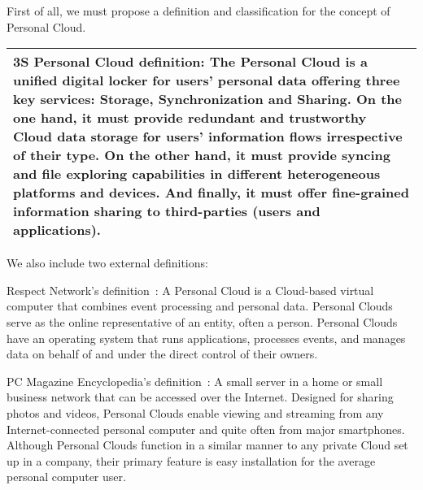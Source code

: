 First of all, we must propose a definition and classification for the concept of Personal Cloud.



{

\noindent\noindent\begin{tabularx}{\textwidth}{|m{}|}
\hline %
 \rowcolor[gray]{.8}
\textbf{3S Personal Cloud definition:} The Personal Cloud is a unified digital  locker for users' personal data offering three key services: Storage, Synchronization and Sharing.  On the one hand, it must provide redundant and trustworthy Cloud data storage for users' information flows irrespective of their type. On the other hand, it must provide syncing and file exploring capabilities in different heterogeneous platforms and devices. And finally, it must offer fine-grained information sharing to third-parties (users and applications).\\ \hline
\end{tabularx}

}


\bigskip
We also include two external definitions:

Respect Network's definition~\cite{respectnetwork}: A Personal Cloud is a Cloud-based virtual computer that combines event processing and personal data. Personal Clouds serve as the online representative of an entity, often a person. Personal Clouds have an operating system that runs applications, processes events, and manages data on behalf of and under the direct control of their owners. 


PC Magazine Encyclopedia's definition~\cite{pcmag}: A small server in a home or small business network that can be accessed over the Internet. Designed for sharing photos and videos, Personal Clouds enable viewing and streaming from any Internet-connected personal computer and quite often from major smartphones. Although Personal Clouds function in a similar manner to any private Cloud set up in a company, their primary feature is easy installation for the average personal computer user.

